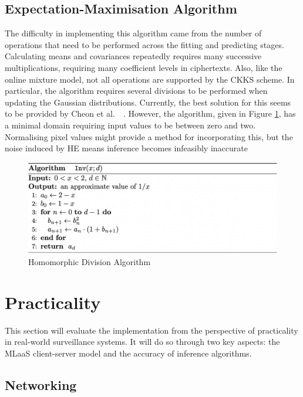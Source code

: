 \subsection{Expectation-Maximisation Algorithm}
\setlength{\leftskip}{0.5cm}
\indent \indent
The difficulty in implementing this algorithm came from the number of operations that need to be performed across the fitting and predicting stages. Calculating means and covariances repeatedly requires many successive multiplications, requiring many coefficient levels in ciphertexts. Also, like the online mixture model, not all operations are supported by the CKKS scheme. In particular, the algorithm requires several divisions to be performed when updating the Gaussian distributions. Currently, the best solution for this seems to be provided by Cheon et al.\ ~\cite{Comparison}. However, the algorithm, given in Figure \ref{fig:division}, has a minimal domain requiring input values to be between zero and two. Normalising pixel values might provide a method for incorporating this, but the noise induced by HE means inference becomes infeasibly inaccurate
\begin{figure}
    \centering
    \includegraphics[width=\textwidth]{figures/algorithm2}
    \caption{Homomorphic Division Algorithm}
    \label{fig:division}
\end{figure}

\setlength{\leftskip}{0cm}




\section{Practicality}
\setlength{\leftskip}{0.25cm}
\indent \indent
This section will evaluate the implementation from the perspective of practicality in real-world surveillance systems. It will do so through two key aspects: the MLaaS client-server model and the accuracy of inference algorithms.

\setlength{\leftskip}{0cm}
\subsection{Networking}
